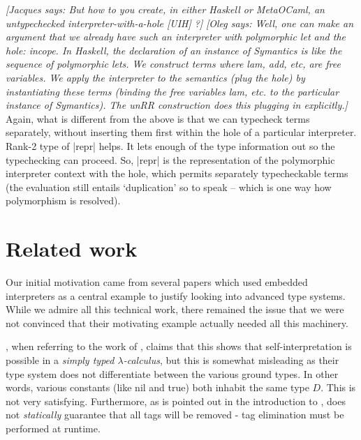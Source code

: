 \documentclass[preprint]{sigplanconf}
\newcommand{\jacques}[1]{{\it [Jacques says: #1]}}
\newcommand{\oleg}[1]{{\it [Oleg says: #1]}}
\begin{document}
\jacques{But how 
to you create, in either Haskell or MetaOCaml, an untypechecked 
interpreter-with-a-hole [UIH] ?}
\oleg{Well, one can make an argument that we already have such an
interpreter with polymorphic let and the hole: incope. In Haskell, the
declaration of an instance of Symantics is like the sequence of
polymorphic lets. We construct terms where lam, add, etc, are free
variables. We apply the interpreter to the semantics (plug the hole)
by instantiating these terms (binding the free variables lam, etc. to
the particular instance of Symantics). The unRR construction does
this plugging in explicitly.}
Again, what is different from the above is that we can
typecheck terms separately, without inserting them first within the
hole of a particular interpreter. Rank-2 type of |repr| helps. It lets
enough of the type information out so the typechecking can
proceed. So, |repr| is the representation of the polymorphic
interpreter context with the hole, which permits separately
typecheckable terms (the evaluation still entails `duplication' so to
speak -- which is one way how polymorphism is resolved).

\section{Related work}\label{related}

Our initial motivation came from several papers 
\citep{WalidICFP02,taha-tag,xi-guarded,peyton-jones-simple} which used
embedded interpreters as a central example to justify looking 
into advanced type systems.  While we admire all this technical work,
there remained the issue that we were not convinced that their 
motivating example actually needed all this machinery.

\citet{WalidICFP02}, when referring to the work of \citet{taha-tag},
claims that this shows that self-interpretation is possible in a
\emph{simply typed $\lambda$-calculus}, but this is somewhat misleading
as their type system does not differentiate between the various ground
types.  In other words, various constants (like \textsf{nil} and 
\textsf{true}) both inhabit the same type $D$.  This is not very satisfying.
Furthermore, as is pointed out in the introduction to \citet{WalidICFP02},
\citet{taha-tag} does not \emph{statically} guarantee that all tags will
be removed - tag elimination must be performed at runtime.
\end{document}

